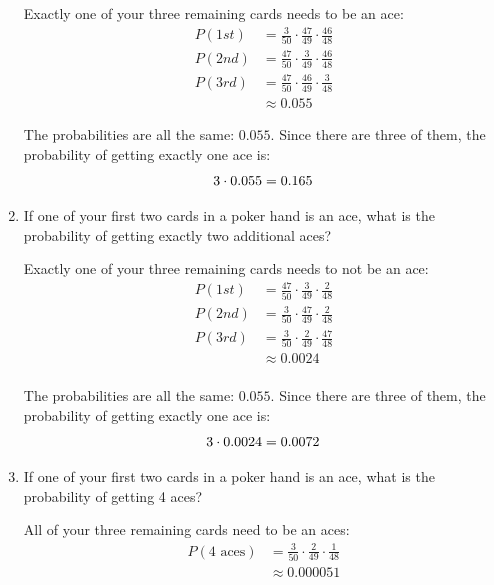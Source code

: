 \documentclass[landscape]{exam}
\begin{document}
\begin{enumerate}
      \begin{solution}
        Exactly one of your three remaining cards needs to be an ace:
        \begin{align*}
          P(1st) & = \frac{3}{50} \cdot \frac{47}{49} \cdot \frac{46}{48} \\
          P(2nd) & = \frac{47}{50} \cdot \frac{3}{49} \cdot \frac{46}{48} \\
          P(3rd) & = \frac{47}{50} \cdot \frac{46}{49} \cdot \frac{3}{48} \\
                 & \approx 0.055
        \end{align*}

        The probabilities are all the same: $0.055$. Since there are three of
        them, the probability of getting exactly one ace is: 
        \[
          3 \cdot 0.055 = 0.165 \\
        \]
      \end{solution}

    \item If one of your first two cards in a poker hand is an ace, what is the
      probability of getting exactly two additional aces?

      \begin{solution}
        Exactly one of your three remaining cards needs to not be an ace:
        \begin{align*}
          P(1st) & = \frac{47}{50} \cdot \frac{3}{49} \cdot \frac{2}{48} \\
          P(2nd) & = \frac{3}{50} \cdot \frac{47}{49} \cdot \frac{2}{48} \\
          P(3rd) & = \frac{3}{50} \cdot \frac{2}{49} \cdot \frac{47}{48} \\
                 & \approx 0.0024 \\
        \end{align*}

        The probabilities are all the same: $0.055$. Since there are three of
        them, the probability of getting exactly one ace is: 
        \[
          3 \cdot 0.0024 = 0.0072 \\
        \]
      \end{solution}

    \item If one of your first two cards in a poker hand is an ace, what is the
      probability of getting 4 aces?

      \begin{solution}
        All of your three remaining cards need to be an aces:
        \begin{align*}
          P(\text{4 aces}) & = \frac{3}{50} \cdot \frac{2}{49} \cdot \frac{1}{48} \\
                           & \approx \boxed{ 0.000051 } \\
        \end{align*}
      \end{solution}
  \end{enumerate}
\end{document}
